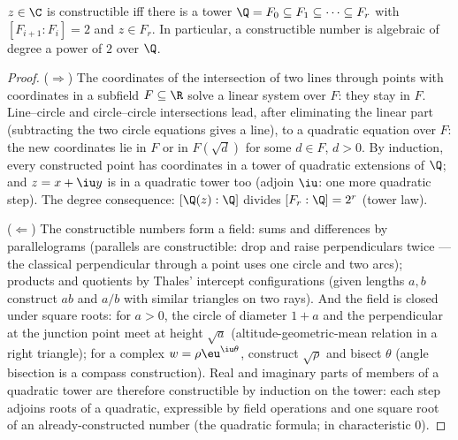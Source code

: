 \begin{theorem}[Wantzel]\label{thm:b3:galois:wantzel}
$z \in \C$ is constructible iff there is a tower $\Q = F_0
\subseteq F_1 \subseteq \dots \subseteq F_r$ with $[F_{i+1} :
F_i] = 2$ and $z \in F_r$. In particular, a constructible number
is algebraic of degree a power of $2$ over
$\Q$.
\end{theorem}

\begin{proof}
($\Rightarrow$) The coordinates of the intersection of two lines
through points with coordinates in a subfield $F \subseteq \R$
solve a linear system over $F$: they stay in $F$. Line--circle
and circle--circle intersections lead, after eliminating the
linear part (subtracting the two circle equations gives a line),
to a quadratic equation over $F$: the new coordinates lie in $F$
or in $F(\sqrt d)$ for some $d \in F$, $d > 0$. By induction,
every constructed point has coordinates in a tower of quadratic
extensions of $\Q$; and $z = x + \iu y$ is in a quadratic tower
too (adjoin $\iu$: one more quadratic step). The degree
consequence: $[\Q(z):\Q]$ divides $[F_r : \Q] = 2^r$ (tower
law).

($\Leftarrow$) The constructible numbers form a field: sums and
differences by parallelograms (parallels are constructible:
drop and raise perpendiculars twice --- the classical
perpendicular through a point uses one circle and two arcs);
products and quotients by Thales' intercept configurations
(given lengths $a, b$ construct $ab$ and $a/b$ with similar
triangles on two rays). And the field is closed under square
roots: for $a > 0$, the circle of diameter $1 + a$ and the
perpendicular at the junction point meet at height $\sqrt a$
(altitude-geometric-mean relation in a right triangle); for a
complex $w = \rho\eu^{\iu\theta}$, construct $\sqrt\rho$ and
bisect $\theta$ (angle bisection is a compass construction).
Real and imaginary parts of members of a quadratic tower are
therefore constructible by induction on the tower: each step
adjoins roots of a quadratic, expressible by field operations
and one square root of an already-constructed number (the
quadratic formula; in characteristic $0$).
\end{proof}

